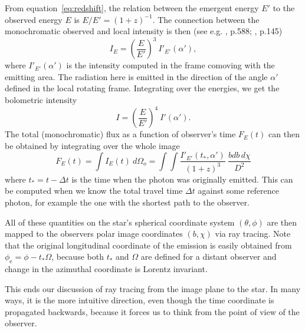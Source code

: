 \documentclass{aa}
\newcommand{\be}{\begin{equation}}
\newcommand{\ee}{\end{equation}}
\begin{document}
From equation~\eqref{eq:redshift}, the relation between the emergent energy $E'$ to the observed energy $E$ is $E/E' = (1 + z)^{-1}$.
The connection between the monochromatic observed and local intensity is then (see e.g. \citealt{MTW73}, p.588; \citealt{RL79}, p.145)
\be
I_E = \left( \frac{E}{E'} \right)^3 ~I'_{E'}(\alpha'),
\ee
where $I'_{E'}(\alpha')$ is the intensity computed in the frame comoving with the emitting area.
The radiation here is emitted in the direction of the angle $\alpha'$ defined in the local rotating frame.
Integrating over the energies, we get the bolometric intensity
\be
I = \left(\frac{E}{E'} \right)^4 ~I'(\alpha').
\ee
The total (monochromatic) flux as a function of observer's time $F_E(t)$ can then be obtained by integrating over the whole image
\be\label{eq:fluxint}
F_E(t) = \int I_{E}(t) ~d\Omega_o = \int\int \frac{I'_{E'}(t_*, \alpha')}{(1+z)^3}  ~\frac{bdb \, d\chi}{D^2}
\ee
where $t_* = t - \Delta t$ is the time when the photon was originally emitted. 
This can be computed when we know the total travel time $\Delta t$ against some reference photon, for example the one with the shortest path to the observer.

All of these quantities on the star's spherical coordinate system $(\theta, \phi)$ are then mapped to the observers polar image coordinates $(b, \chi)$ via ray tracing.
Note that the original longitudinal coordinate of the emission is easily obtained from $\phi_{\mathrm{e}} = \phi - t_* \Omega$, because both $t_*$ and $\Omega$ are defined for a distant observer and change in the azimuthal coordinate is Lorentz invariant.

This ends our discussion of ray tracing from the image plane to the star.
In many ways, it is the more intuitive direction, even though the time coordinate is propagated backwards, because it forces us to think from the point of view of the observer.
\end{document}
